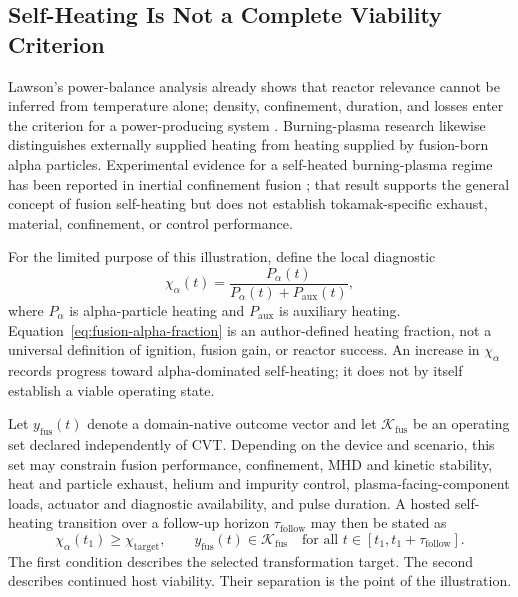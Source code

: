 \documentclass[11pt]{article}
\begin{document}
\subsection{Self-Heating Is Not a Complete Viability Criterion}

Lawson's power-balance analysis already shows that reactor relevance cannot be inferred from temperature alone; density, confinement, duration, and losses enter the criterion for a power-producing system \cite{lawson1957}. Burning-plasma research likewise distinguishes externally supplied heating from heating supplied by fusion-born alpha particles. Experimental evidence for a self-heated burning-plasma regime has been reported in inertial confinement fusion \cite{zylstra2022}; that result supports the general concept of fusion self-heating but does not establish tokamak-specific exhaust, material, confinement, or control performance.

For the limited purpose of this illustration, define the local diagnostic
\begin{equation}
    \chi_{\alpha}(t)
    =
    \frac{P_{\alpha}(t)}{P_{\alpha}(t)+P_{\mathrm{aux}}(t)},
    \label{eq:fusion-alpha-fraction}
\end{equation}
where \(P_{\alpha}\) is alpha-particle heating and \(P_{\mathrm{aux}}\) is auxiliary heating. Equation~\eqref{eq:fusion-alpha-fraction} is an author-defined heating fraction, not a universal definition of ignition, fusion gain, or reactor success. An increase in \(\chi_{\alpha}\) records progress toward alpha-dominated self-heating; it does not by itself establish a viable operating state.

Let \(y_{\mathrm{fus}}(t)\) denote a domain-native outcome vector and let \(\mathcal K_{\mathrm{fus}}\) be an operating set declared independently of CVT. Depending on the device and scenario, this set may constrain fusion performance, confinement, MHD and kinetic stability, heat and particle exhaust, helium and impurity control, plasma-facing-component loads, actuator and diagnostic availability, and pulse duration. A hosted self-heating transition over a follow-up horizon \(\tau_{\mathrm{follow}}\) may then be stated as
\begin{equation}
    \chi_{\alpha}(t_1)
    \geq
    \chi_{\mathrm{target}},
    \qquad
    y_{\mathrm{fus}}(t)
    \in
    \mathcal K_{\mathrm{fus}}
    \quad
    \text{for all }t\in[t_1,t_1+\tau_{\mathrm{follow}}].
    \label{eq:fusion-hosted-condition}
\end{equation}
The first condition describes the selected transformation target. The second describes continued host viability. Their separation is the point of the illustration.
\end{document}
